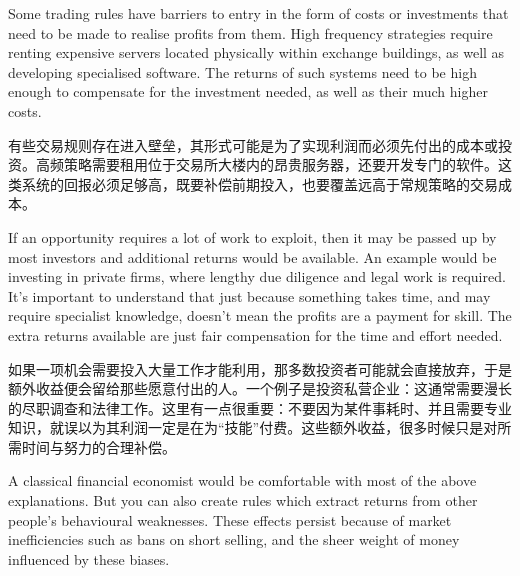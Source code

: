 \begin{englishblock} Some trading rules have barriers to entry in the form of costs or investments that need to be made to realise profits from them. High frequency strategies require renting expensive servers located physically within exchange buildings, as well as developing specialised software. The returns of such systems need to be high enough to compensate for the investment needed, as well as their much higher costs. \end{englishblock}

\begin{chineseblock}有些交易规则存在进入壁垒，其形式可能是为了实现利润而必须先付出的成本或投资。高频策略需要租用位于交易所大楼内的昂贵服务器，还要开发专门的软件。这类系统的回报必须足够高，既要补偿前期投入，也要覆盖远高于常规策略的交易成本。\end{chineseblock}

\bipairgap

\begin{englishblock} If an opportunity requires a lot of work to exploit, then it may be passed up by most investors and additional returns would be available. An example would be investing in private firms, where lengthy due diligence and legal work is required. It's important to understand that just because something takes time, and may require specialist knowledge, doesn't mean the profits are a payment for skill. The extra returns available are just fair compensation for the time and effort needed. \end{englishblock}

\begin{chineseblock}如果一项机会需要投入大量工作才能利用，那多数投资者可能就会直接放弃，于是额外收益便会留给那些愿意付出的人。一个例子是投资私营企业：这通常需要漫长的尽职调查和法律工作。这里有一点很重要：不要因为某件事耗时、并且需要专业知识，就误以为其利润一定是在为“技能”付费。这些额外收益，很多时候只是对所需时间与努力的合理补偿。\end{chineseblock}


\begin{englishblock} A classical financial economist would be comfortable with most of the above explanations. But you can also create rules which extract returns from other people's behavioural weaknesses. These effects persist because of market inefficiencies such as bans on short selling, and the sheer weight of money influenced by these biases. \end{englishblock}

